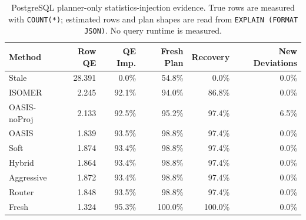 \begin{table}[t]
  \centering
  \small
  \caption{PostgreSQL planner-only statistics-injection evidence. True rows are measured with \texttt{COUNT(*)}; estimated rows and plan shapes are read from \texttt{EXPLAIN (FORMAT JSON)}. No query runtime is measured.}
  \label{tab:postgres_planner_stats_injection}
  \setlength{\tabcolsep}{4pt}
  \begin{tabular}{lrrrrr}
    \toprule
    Method & Row QE & QE Imp. & Fresh Plan & Recovery & New Deviations \\
    \midrule
    Stale & 28.391 & 0.0\% & 54.8\% & 0.0\% & 0.0\% \\
    ISOMER & 2.245 & 92.1\% & 94.0\% & 86.8\% & 0.0\% \\
    OASIS-noProj & 2.133 & 92.5\% & 95.2\% & 97.4\% & 6.5\% \\
    OASIS & 1.839 & 93.5\% & 98.8\% & 97.4\% & 0.0\% \\
    Soft & 1.874 & 93.4\% & 98.8\% & 97.4\% & 0.0\% \\
    Hybrid & 1.864 & 93.4\% & 98.8\% & 97.4\% & 0.0\% \\
    Aggressive & 1.872 & 93.4\% & 98.8\% & 97.4\% & 0.0\% \\
    Router & 1.848 & 93.5\% & 98.8\% & 97.4\% & 0.0\% \\
    Fresh & 1.324 & 95.3\% & 100.0\% & 100.0\% & 0.0\% \\
    \bottomrule
  \end{tabular}
\end{table}
